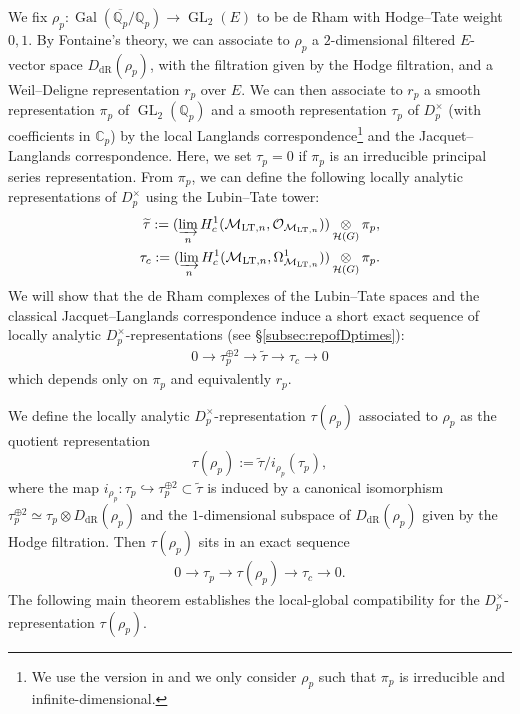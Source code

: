 \documentclass{article}
\theoremstyle{definition}
\def\calH{\mathcal{H}}
\def\calM{\mathcal{M}}
\def\calO{\mathcal{O}}
\def\bbC{\mathbb{C}}
\def\bbQ{\mathbb{Q}}
\DeclareMathOperator{\ox}{\otimes}
\newcommand{\dlim}{\varinjlim}
\DeclareMathOperator{\Gal}{Gal}
\DeclareMathOperator{\GL}{GL}
\DeclareMathOperator{\dR}{dR}
\def\LT{\mathrm{LT}}
\begin{document}
We fix $\rho_p:\Gal(\overline{\bbQ_p}/\bbQ_p)\rightarrow\GL_2(E)$ to be de Rham with Hodge--Tate weight $0,1$. By Fontaine's theory, we can associate to $\rho_p$ a $2$-dimensional filtered $E$-vector space $D_{\dR}(\rho_p)$, with the filtration given by the Hodge filtration, and a Weil--Deligne representation $r_p$ over $E$. We can then associate to $r_p$ a smooth representation $\pi_p$ of $\GL_2(\bbQ_p)$ and a smooth representation $\tau_p$ of $D_p^\times$ (with coefficients in $\bbC_p$) by the local Langlands correspondence\footnote{We use the version in \cite[\S 4.2]{emerton2011local} and we only consider $\rho_p$ such that $\pi_p$ is irreducible and infinite-dimensional.} and the Jacquet--Langlands correspondence. Here, we set $\tau_p=0$ if $\pi_p$ is an irreducible principal series representation. From $\pi_p$, we can define the following locally analytic representations of $D_p^{\times}$ using the Lubin--Tate tower:
\begin{align*}
    \widetilde{\tau}:=(\dlim_n H^1_c(\calM_{\LT,n},\calO_{\calM_{\LT,n}}))\ox_{\calH(G)}\pi_p,\\
    \tau_c:=(\dlim_n H^1_c(\calM_{\LT,n},\Omega_{\calM_{\LT,n}}^1))\ox_{\calH(G)}\pi_p.
\end{align*}
We will show that the de Rham complexes of the Lubin--Tate spaces and the classical Jacquet--Langlands correspondence induce a short exact sequence of locally analytic $D_p^\times$-representations (see \S\ref{subsec:repofDptimes}):
\begin{align*}\label{equationintroductionexactseuqnece}
    0\to\tau_p^{\oplus 2} \rightarrow \widetilde{\tau}\to \tau_c\to 0
\end{align*}
which depends only on $\pi_p$ and equivalently $r_p$.

We define the locally analytic $D_p^{\times}$-representation $\tau(\rho_p)$ associated to $\rho_p$ as the quotient representation
\[\tau(\rho_p):=\widetilde{\tau}/i_{\rho_p}(\tau_p),\]
where the map $i_{\rho_p}:\tau_p\hookrightarrow \tau_p^{\oplus 2}\subset \widetilde{\tau}$ is induced by a canonical isomorphism $\tau_p^{\oplus 2}\simeq \tau_p\otimes D_{\dR}(\rho_p)$ and the $1$-dimensional subspace of $D_{\dR}(\rho_p)$ given by the Hodge filtration. Then $\tau(\rho_p)$ sits in an exact sequence
\begin{align}\label{equationintroextension}
    0\rightarrow \tau_p\rightarrow \tau(\rho_p)\rightarrow \tau_c\rightarrow 0.
\end{align}
The following main theorem establishes the local-global compatibility for the $D_p^{\times}$-representation $\tau(\rho_p)$.
\end{document}
